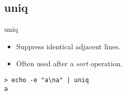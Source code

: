 \subsection{uniq}

\begin{frame}[fragile]{uniq}
\begin{itemize}
\item Suppress identical adjacent lines.
\pause \item Often used after a \emph{sort} operation.
\end{itemize}
  \pause
  \begin{exampleblock}{}
    \begin{lstlisting}[showstringspaces=false]
> echo -e "a\na" | uniq
a
    \end{lstlisting}
  \end{exampleblock}
\end{frame}

